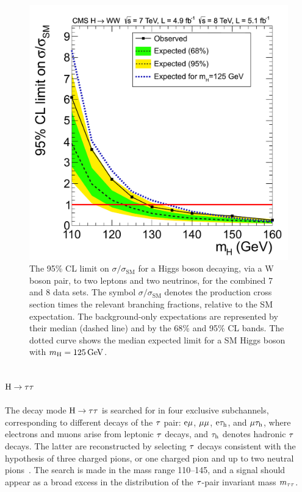 \documentclass[11pt,twoside,a4paper,cmspaper,final]{cms-tdr}
\begin{document}
\begin{figure}[htbp]
  \begin{center}
    \includegraphics[width=\cmsFigWideWidth]{sqr_acls_hww_nominal_inject_ylin}
    \caption{The 95\% CL limit on $\sigma/\sigma_\mathrm{SM}$ for a Higgs boson
      decaying, via a W boson pair, to two leptons and two neutrinos,
       for the combined 7 and 8\TeV
      data sets. The symbol $\sigma/\sigma_\mathrm{SM}$ denotes the
      production cross section times the relevant branching fractions, relative to the SM expectation.
The background-only expectations are represented by their median (dashed line) and by the 68\%  and 95\% CL bands. The dotted curve shows the median expected limit for a SM Higgs boson with $m_{\mathrm{H}}=125\,\text{Ge\hspace{-.08em}V}$.
}
    \label{fig:WWlimit}
  \end{center}
\end{figure}



\subsection{\texorpdfstring{$\mathrm{H}\to\tau\tau$}{H to tau tau}\label{sec:Htt}}

The decay mode $\mathrm{H}\to\tau\tau$ is searched for in four
exclusive subchannels, corresponding to different decays of the $\tau$ pair:
$\mathrm{e}{\mu}$, ${\mu}{\mu}$, $\mathrm{e} \tau_{\mathrm{h}}$, and
${\mu} \tau_{\mathrm{h}}$, where electrons and muons arise from
leptonic $\tau$ decays, and $\tau_{\mathrm{h}}$ denotes hadronic
$\tau$ decays.  The latter are reconstructed by selecting
$\tau$ decays consistent with the hypothesis of
three charged pions, or one charged pion and up to
two neutral pions~\cite{CMS-PAPERS-TAU-11-001}.
The search is made in the mass range 110--145\GeV, and a
signal should appear as a broad excess in the distribution of the $\tau$-pair
invariant mass $m_{\tau\tau}$.
\end{document}
